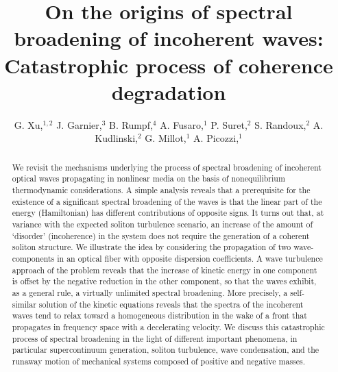 \documentclass[pra,twocolumn,showpacs,preprintnumbers,amsmath,amssymb]{revtex4}
\begin{document}

\title{On the origins of spectral broadening of incoherent waves:\\ Catastrophic process of coherence degradation}



\author{G. Xu,$^{1,2}$ J. Garnier,$^3$ B. Rumpf,$^4$  A. Fusaro,$^1$ P. Suret,$^2$ S. Randoux,$^2$ A. Kudlinski,$^2$ G. Millot,$^1$ A. Picozzi,$^1$}



\begin{abstract}
We revisit the mechanisms underlying the process of spectral broadening of incoherent optical waves propagating in nonlinear media on the basis of  nonequilibrium thermodynamic considerations.
A simple analysis reveals that a prerequisite for the existence of a significant spectral broadening of the waves is that the linear part of the energy (Hamiltonian) has different contributions of opposite signs.
It turns out that, at variance with the expected soliton turbulence scenario, an increase of the amount of `disorder' (incoherence) in the system does not require the generation of a coherent soliton structure.
We illustrate the idea by considering the propagation of two wave-components in an optical fiber with opposite dispersion coefficients.
A wave turbulence approach of the problem reveals that the increase of kinetic energy in one component is offset by the negative reduction in the other component, so that the waves exhibit, as a general rule, a virtually unlimited spectral broadening.
More precisely, a self-similar solution of the kinetic equations reveals that the spectra of the incoherent waves tend to relax toward a homogeneous distribution in the wake of a front that propagates in frequency space with a  decelerating velocity.
We discuss this catastrophic process of spectral broadening in the light of different important phenomena, in particular  supercontinuum generation, soliton turbulence, wave condensation, and the runaway motion of mechanical systems composed of positive and negative masses.
\end{abstract}
\end{document}

